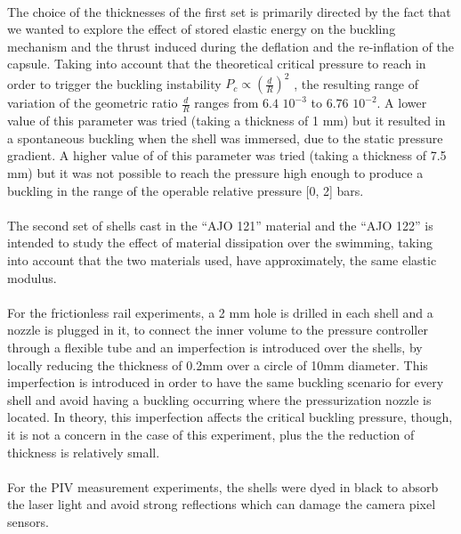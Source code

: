 \paragraph{}
The choice of the thicknesses of the first set is primarily directed by the fact that we wanted to explore the effect of stored elastic energy on the buckling mechanism and the thrust induced during the deflation and the re-inflation of the capsule. Taking into account that the theoretical critical pressure to reach in order to trigger the buckling instability $P_c \propto (\frac{d}{R})^2$ \cite{cqpcritic2011} , the resulting range of variation of the geometric ratio $\frac{d}{R}$ ranges from $6.4$ $10^{-3}$ to $6.76$ $10^{-2}$.
A lower value of this parameter was tried (taking a thickness of 1 mm) but it resulted in a spontaneous buckling when the shell was immersed, due to the static pressure gradient.
A higher value of of this parameter was tried (taking a thickness of 7.5 mm) but it was not possible to reach the pressure high enough to produce a buckling in the range of the operable relative pressure [0, 2] bars.
\paragraph{}
The second set of shells cast in the "`AJO 121"' material and the "`AJO 122"' is intended to study the effect of material dissipation over the swimming, taking into account that the two materials used, have approximately, the same elastic modulus.

\paragraph{}
For the frictionless rail experiments, a 2 mm hole is drilled in each shell and a nozzle is plugged in it, to connect the inner volume to the pressure controller through a flexible tube and an imperfection is introduced over the shells, by locally reducing the thickness of 0.2mm over a circle of 10mm diameter. This imperfection is introduced in order to have the same buckling scenario for every shell and avoid having a buckling occurring where the pressurization nozzle is located.
In theory, this imperfection affects the critical buckling pressure\cite{Preis}, though, it is not a concern in the case of this experiment, plus the the reduction of thickness is relatively small.
\paragraph{}
For the PIV measurement experiments, the shells were dyed in black to absorb the laser light and avoid strong reflections which can damage the camera pixel sensors.

